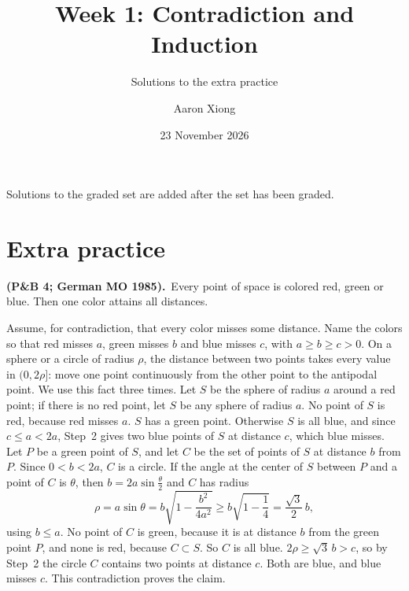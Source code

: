 \documentclass[10pt]{scrartcl}
\title{Week 1: Contradiction and Induction}
\subtitle{Solutions to the extra practice}
\author{Aaron Xiong}
\date{23 November 2026}
\begin{document}
\maketitle

Solutions to the graded set are added after the set has been graded.

\section{Extra practice}

\begin{prob}\textbf{ (P\&B 4; German MO 1985).}\ Every point of space is colored red, green or blue. Then one color attains all distances.\par
{}
\begin{steps}
  \ii Assume, for contradiction, that every color misses some distance. Name the colors so that red misses $a$, green misses $b$ and blue misses $c$, with $a \geq b \geq c > 0$.
  \ii On a sphere or a circle of radius $\rho$, the distance between two points takes every value in $(0, 2\rho]$: move one point continuously from the other point to the antipodal point. We use this fact three times.
  \ii Let $S$ be the sphere of radius $a$ around a red point; if there is no red point, let $S$ be any sphere of radius $a$. No point of $S$ is red, because red misses $a$.
  \ii $S$ has a green point. Otherwise $S$ is all blue, and since $c \leq a < 2a$, Step~2 gives two blue points of $S$ at distance $c$, which blue misses.
  \ii Let $P$ be a green point of $S$, and let $C$ be the set of points of $S$ at distance $b$ from $P$. Since $0 < b < 2a$, $C$ is a circle. If the angle at the center of $S$ between $P$ and a point of $C$ is $\theta$, then $b = 2a\sin\frac\theta2$ and $C$ has radius
  \[ \rho = a \sin\theta = b\sqrt{1 - \frac{b^2}{4a^2}} \geq b\sqrt{1 - \frac14} = \frac{\sqrt3}{2}\, b, \]
  using $b \leq a$.
  \ii No point of $C$ is green, because it is at distance $b$ from the green point $P$, and none is red, because $C \subset S$. So $C$ is all blue.
  \ii $2\rho \geq \sqrt3\, b > c$, so by Step~2 the circle $C$ contains two points at distance $c$. Both are blue, and blue misses $c$. This contradiction proves the claim.
\end{steps}
\end{prob}
\end{document}
